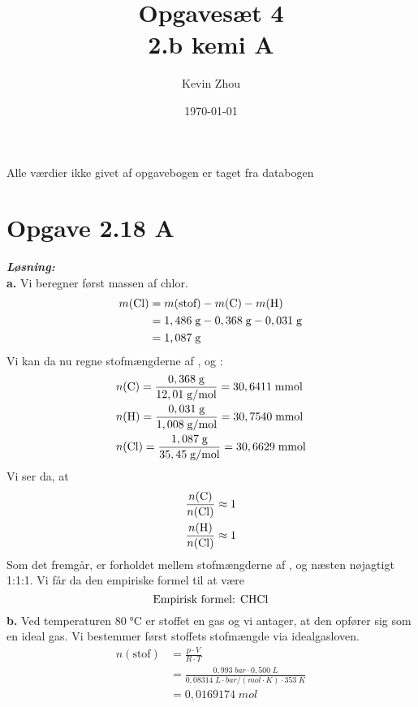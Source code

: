 \documentclass{report}
\title{Opgavesæt 4\\
{\Large \textbf{2.b kemi A}}}
\author{Kevin Zhou}
\date{\today}
\newcommand{\sol}{\setlength{\parindent}{0cm}\textbf{\textit{Løsning:}}\setlength{\parindent}{1cm}}
\begin{document}
\maketitle
\begin{note}
  Alle værdier ikke givet af opgavebogen er taget fra databogen
\end{note}
\section*{Opgave 2.18 A}
\sol \\
\textbf{a.} 
Vi beregner først massen af chlor.
\begin{equation*}
\begin{split}
  m(\text{\ce{Cl}} )&=m(\text{stof} )-m(\ce{C} )-m(\ce{H} )\\ 
  &=1,486 \;\unit{g} -0,368 \;\unit{g} -0,031 \;\unit{g} \\ 
  &=1,087 \;\unit{g} 
\end{split}
\end{equation*}
Vi kan da nu regne stofmængderne af ,  og :
\begin{equation*}
\begin{split}
  &n(\ce{C} )=\frac{0,368 \;\unit{g} }{12,01 \;\unit{g/mol} }=30,6411 \;\unit{mmol} \\ 
  &n(\ce{H} )=\frac{0,031 \;\unit{g} }{1,008 \;\unit{g/mol} }=30,7540 \;\unit{mmol} \\ 
  &n(\ce{Cl} )=\frac{1,087 \;\unit{g} }{35,45 \;\unit{g/mol} }=30,6629 \;\unit{mmol} 
\end{split}
\end{equation*}
Vi ser da, at
\begin{equation*}
\begin{split}
  \frac{n(\ce{C} )}{n(\ce{Cl} )}&\approx 1\\ 
  \frac{n(\ce{H} )}{n(\ce{Cl} )}&\approx 1
\end{split}
\end{equation*}
Som det fremgår, er forholdet mellem stofmængderne af ,  og  næsten nøjagtigt 1:1:1.
Vi får da den empiriske formel til at være
\[
\text{Empirisk formel: } \ce{CHCl} 
\] 
\textbf{b.}
Ved temperaturen $80 \;\unit{\celsius} $ er stoffet en gas og vi antager, at den opfører sig som en ideal gas. 
Vi bestemmer først stoffets stofmængde via idealgasloven.
\begin{equation*}
\begin{split}
  n(\text{stof})&=\frac{p \cdot V}{R\cdot T}\\ 
  &=\frac{0,993 \;\unit{bar} \cdot 0,500 \;\unit{L} }{0,08314 \;\unit{L \cdot bar/(mol \cdot K)} \cdot 353 \;\unit{K} }\\ 
  &=0,0169174 \;\unit{mol} 
\end{split}
\end{equation*}
\end{document}
